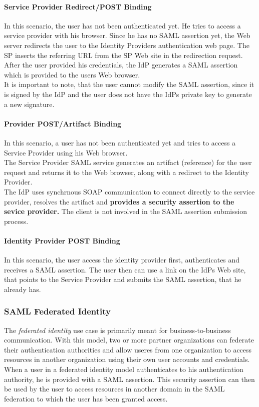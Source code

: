 \documentclass[12pt,a4paper]{univention}
\begin{document}
\paragraph{Service Provider Redirect/POST Binding}
In this scenario, the user has not been authenticated yet. He tries to access a service provider with his browser. Since he has no SAML assertion yet, the Web server redirects the user to the Identity Providers authentication web page. The SP inserts the referring URL from the SP Web site in the redirection request.\\
After the user provided his credentials, the IdP generates a SAML assertion which is provided to the users Web browser.\\
It is important to note, that the user cannot modify the SAML assertion, since it is signed by the IdP and the user does not have the IdPs private key to generate a new signature.
\paragraph{Provider POST/Artifact Binding}
In this scenario, a user has not been authenticated yet and tries to access a Service Provider using his Web browser.\\
The Service Provider SAML service generates an artifact (reference) for the user request and returns it to the Web browser, along with a redirect to the Identity Provider. \\
The IdP uses synchrnous SOAP communication to connect directly to the service provider, resolves the artifact and \textbf{provides a security assertion to the sevice provider.}
The client is not involved in the SAML assertion submission process.\\
\paragraph{Identity Provider POST Binding}
In this scenario, the user access the identity provider first, authenticates and receives a SAML assertion. The user then can use a link on the IdPs Web site, that points to the Service Provider and submits the SAML assertion, that he already has.\\
\subsubsection{SAML Federated Identity}
The \textit{federated identity} use case is primarily meant for business-to-business communication. With this model, two or more partner organizations can federate their authentication authorities and allow useres from one organization to access resources in another organization using their own user accounts and credentials.\\
When a user in a federated identity model authenticates to his authentication authority, he is provided with a SAML assertion. This security assertion can then be used by the user to access resources in another domain in the SAML federation to which the user has been granted access.
\end{document}
